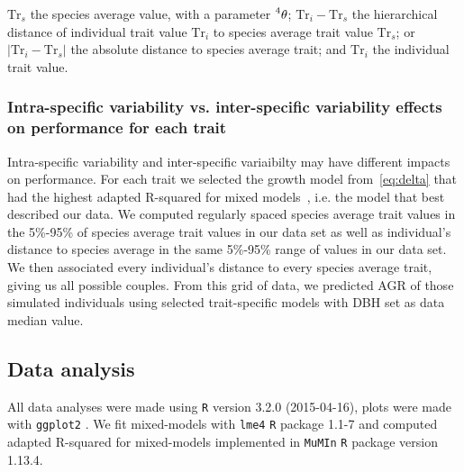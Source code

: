  $\text{Tr}_s$ the species average value, with a parameter $\prescript{4}{}\theta$; $\text{Tr}_i - \text{Tr}_s$ the hierarchical distance of individual trait value $\text{Tr}_i$ to species average trait value $\text{Tr}_s$; or $\vert \text{Tr}_i - \text{Tr}_s \vert$ the absolute distance to species average trait; and $\text{Tr}_i$ the individual trait value.

\subsubsection{Intra-specific variability vs. inter-specific variability effects on performance for each trait}

Intra-specific variability and inter-specific variaibilty may have different impacts on performance. For each trait we selected the growth model from~\autoref{eq:delta} that had the highest adapted R-squared for mixed models~\citep{nakagawa_general_2013}, i.e. the model that best described our data. 
We computed regularly spaced species average trait values in the 5\%-95\% of species average trait values in our data set as well as individual's distance to species average in the same 5\%-95\% range of values in our data set. We then associated every individual's distance to every species average trait, giving us all possible couples. From this grid of data, we predicted AGR of those simulated individuals using selected trait-specific models with DBH set as data median value.

\subsection*{Data analysis}

All data analyses were made using \texttt{R} \citep{R_language} version 3.2.0 (2015-04-16), plots were made with \texttt{ggplot2} \citep{ggplot2_pkg}. We fit mixed-models with \texttt{lme4} \texttt{R} package \citep{lme4_pkg} 1.1-7 and computed adapted R-squared for mixed-models \citep{nakagawa_general_2013} implemented in \texttt{MuMIn} \texttt{R} package \citep{mumin_pkg} version 1.13.4.

